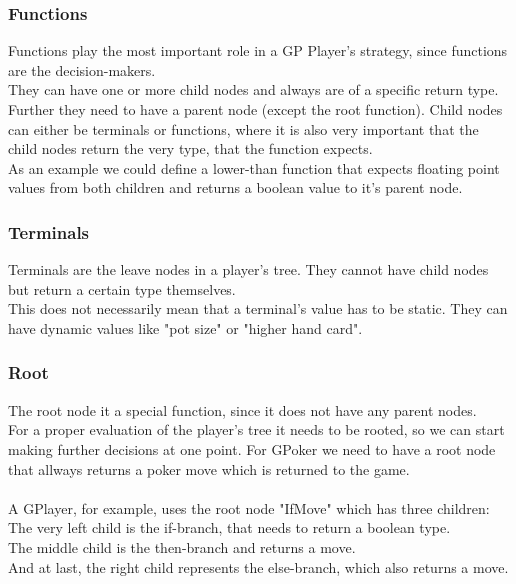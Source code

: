 \documentclass[12pt,fleqn,a4paper]{article}
\begin{document}
\subsubsection{Functions}
Functions play the most important role in a GP Player's strategy, since functions are the decision-makers.\\
They can have one or more child nodes and always are of a specific return type. Further they need to have a parent node (except the root function).
Child nodes can either be terminals or functions, where it is also very important that the child nodes return the very type, that the function expects.\\
As an example we could define a lower-than function that expects floating point values from both children and returns a boolean value to it's parent node.

\subsubsection{Terminals}
Terminals are the leave nodes in a player's tree. They cannot have child nodes but return a certain type themselves.\\
This does not necessarily mean that a terminal's value has to be static. They can have dynamic values like "pot size" or "higher hand card". 

\subsubsection{Root}
The root node it a special function, since it does not have any parent nodes.\\
For a proper evaluation of the player's tree it needs to be rooted, so we can start making further decisions at one point.
For GPoker we need to have a root node that allways returns a poker move which is returned to the game.\\
~\\
A GPlayer, for example, uses the root node "IfMove" which has three children:\\
The very left child is the if-branch, that needs to return a boolean type.\\
The middle child is the then-branch and returns a move.\\
And at last, the right child represents the else-branch, which also returns a move.\\

\newpage
\end{document}
